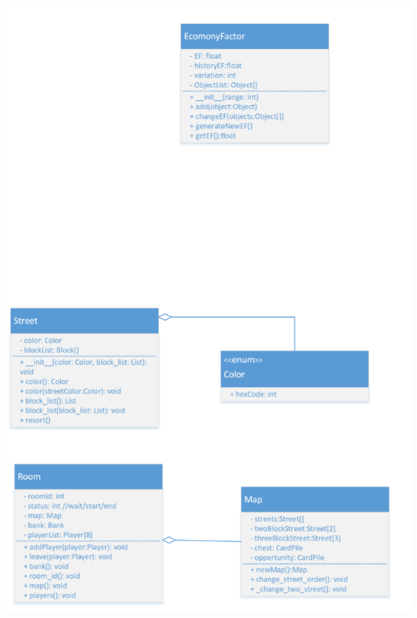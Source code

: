 \documentclass[a4paper,12pt]{article}
\begin{document}
\includegraphics[scale=1.3]{image/efandmain.png}
\end{document}
